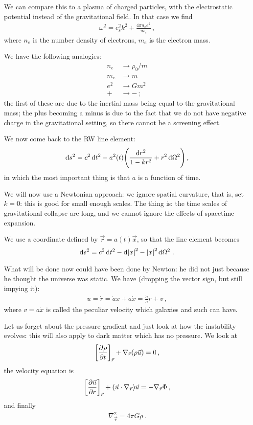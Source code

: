 \documentclass[main.tex]{subfiles}
\begin{document}
We can compare this to a plasma of charged particles, with the electrostatic potential instead of the gravitational field. 
In that case we find 
%
\begin{align}
  \omega^2 = c_s^2 k^2 + \frac{4 \pi n_e e^2}{m_e}
\,,
\end{align}
%
where \(n_e\) is the number density of electrons, \(m_e\) is the electron mass. 

We have the following analogies: 
%
\begin{align}
  n_e &\rightarrow \rho_0 / m  \\
  m_e &\rightarrow m  \\
  e^2 &\rightarrow Gm^2  \\
  + &\rightarrow -
\,;
\end{align}
%
the first of these are due to the inertial mass being equal to the gravitational mass; the plus becoming a minus is due to the fact that we do not have negative charge in the gravitational setting, so there cannot be a screening effect. 

We now come back to the RW line element: 
%
\begin{align}
  \dd{s^2} = c^2 \dd{t^2} 
  -a^2(t) \qty(\frac{ \dd{r^2}}{1 - kr^2} + r^2 \dd{\Omega^2})
\,,
\end{align}
%
in which the most important thing is that \(a\) is a function of time. 

We will now use a Newtonian approach: we ignore spatial curvature, that is, set \(k=0\): this is good for small enough scales. The thing is: the time scales of gravitational collapse are long, and we cannot ignore the effects of spacetime expansion. 

We use a coordinate defined by \(\vec{r} = a(t) \vec{x}\), so that the line element becomes 
%
\begin{align}
  \dd{s^2} = c^2 \dd{t^2} - \dd{\abs{x}^2} - 
\abs{x}^2 \dd{\Omega^2}
\,. 
\end{align}
%

What will be done now could have been done by Newton: he did not just because he thought the universe was static. We have (dropping the vector sign, but still impying it): 
%
\begin{align}
  u = \dot{r} = \dot{a} x + a \dot{x} 
  = \frac{\dot{a}}{a} r + v
\,,
\end{align}
%
where \(v = a \dot{x}\) is called the peculiar velocity which galaxies and such can have.  

Let us forget about the pressure gradient and just look at how the instability evolves: this will also apply to dark matter which has no pressure. We look at 
%
\begin{align}
  \qty[\pdv[]{\rho }{t} ]_{\vec{r}} + \nabla_{\vec{r}} \qty(\rho \vec{u}) = 0 
\,,
\end{align}
%
the velocity equation is 
%
\begin{align}
  \qty[\pdv{\vec{u}}{r}]_{\vec{r}} + \qty(\vec{u} \cdot \nabla_{\vec{r}}) \vec{u} = - \nabla_{\vec{r}} \Phi 
\,,
\end{align}
%
and finally 
%
\begin{align}
  \nabla^2_{\vec{r}} = 4 \pi G \rho 
\,.
\end{align}
\end{document}
